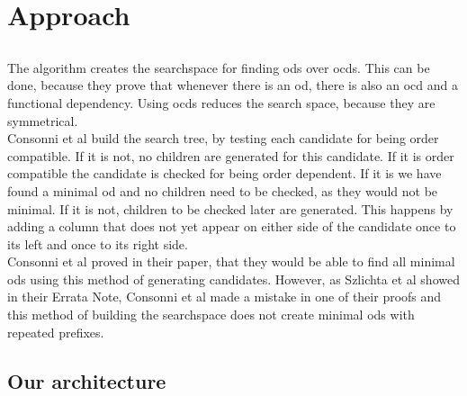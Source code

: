 
\section{Approach}\label{sec:approach}
 
\subsection{\ocddiscover{}}
The \ocddiscover{} algorithm creates the searchspace for finding \glspl{od} over \glspl{ocd}.
This can be done, because they prove that whenever there is an \gls{od}, there is also an \gls{ocd} and a functional dependency.
Using \glspl{ocd} reduces the search space, because they are symmetrical. \\
Consonni et al build the search tree, by testing each candidate for being order compatible. 
If it is not, no children are generated for this candidate.
If it is order compatible the candidate is checked for being order dependent. 
If it is we have found a minimal \gls{od} and no children need to be checked, as they would not be minimal.
If it is not, children to be checked later are generated. 
This happens by adding a column that does not yet appear on either side of the candidate once to its left and once to its right side. \\
Consonni et al proved in their paper, that they would be able to find all minimal \glspl{od} using this method of generating candidates.
However, as Szlichta et al showed in their Errata Note, Consonni et al made a mistake in one of their proofs and this method of building the searchspace does not create minimal \glspl{od} with repeated prefixes.

\subsection{Our architecture}
